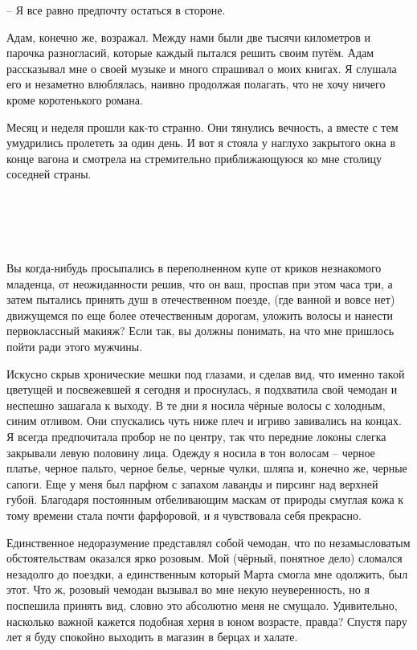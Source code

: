 \documentclass[
]{book}
\begin{document}
-- Я все равно предпочту остаться в стороне.

Адам, конечно же, возражал. Между нами были две тысячи километров и парочка разногласий, которые каждый пытался решить своим путём. Адам рассказывал мне о своей музыке и много спрашивал о моих книгах. Я слушала его и незаметно влюблялась, наивно продолжая полагать, что не хочу ничего кроме коротенького романа.

Месяц и неделя прошли как-то странно. Они тянулись вечность, а вместе с тем умудрились пролететь за один день. И вот я стояла у наглухо закрытого окна в конце вагона и смотрела на стремительно приближающуюся ко мне столицу соседней страны.

\hypertarget{chapter-24}{%
\chapter{~}\label{chapter-24}}

Вы когда-нибудь просыпались в переполненном купе от криков незнакомого младенца, от неожиданности решив, что он ваш, проспав при этом часа три, а затем пытались принять душ в отечественном поезде, (где ванной и вовсе нет) движущемся по еще более отечественным дорогам, уложить волосы и нанести первоклассный макияж? Если так, вы должны понимать, на что мне пришлось пойти ради этого мужчины.

Искусно скрыв хронические мешки под глазами, и сделав вид, что именно такой цветущей и посвежевшей я сегодня и проснулась, я подхватила свой чемодан и неспешно зашагала к выходу. В те дни я носила чёрные волосы с холодным, синим отливом. Они спускались чуть ниже плеч и игриво завивались на концах. Я всегда предпочитала пробор не по центру, так что передние локоны слегка закрывали левую половину лица. Одежду я носила в тон волосам -- черное платье, черное пальто, черное белье, черные чулки, шляпа и, конечно же, черные сапоги. Еще у меня был парфюм с запахом лаванды и пирсинг над верхней губой. Благодаря постоянным отбеливающим маскам от природы смуглая кожа к тому времени стала почти фарфоровой, и я чувствовала себя прекрасно.

Единственное недоразумение представлял собой чемодан, что по незамысловатым обстоятельствам оказался ярко розовым. Мой (чёрный, понятное дело) сломался незадолго до поездки, а единственным который Марта смогла мне одолжить, был этот. Что ж, розовый чемодан вызывал во мне некую неуверенность, но я поспешила принять вид, словно это абсолютно меня не смущало. Удивительно, насколько важной кажется подобная херня в юном возрасте, правда? Спустя пару лет я буду спокойно выходить в магазин в берцах и халате.
\end{document}

